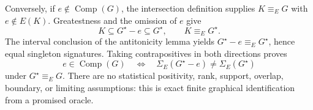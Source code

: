 Conversely, if \(e\notin\operatorname{Comp}(G)\), the intersection definition supplies \(K\equiv_EG\) with \(e\notin E(K)\).  Greatestness and the omission of \(e\) give
\[
 K\subseteq G^\star-e\subseteq G^\star,
 \qquad K\equiv_EG^\star.
\]
The interval conclusion of the antitonicity lemma yields \(G^\star-e\equiv_EG^\star\), hence equal singleton signatures.  Taking contrapositives in both directions proves
\[
 e\in\operatorname{Comp}(G)
 \quad\Longleftrightarrow\quad
 \Sigma_E(G^\star-e)\ne\Sigma_E(G^\star)
\]
under \(G^\star\equiv_EG\).  There are no statistical positivity, rank, support, overlap, boundary, or limiting assumptions: this is exact finite graphical identification from a promised oracle.
